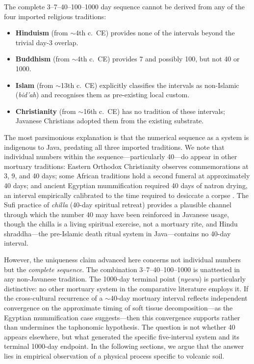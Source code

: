 \documentclass[12pt,a4paper]{article}
\begin{document}
The complete 3--7--40--100--1000 day sequence cannot be derived from any of the four imported religious traditions:

\begin{itemize}[nosep]
\item \textbf{Hinduism} (from $\sim$4th c.\ CE) provides none of the intervals beyond the trivial day-3 overlap.
\item \textbf{Buddhism} (from $\sim$4th c.\ CE) provides 7 and possibly 100, but not 40 or 1000.
\item \textbf{Islam} (from $\sim$13th c.\ CE) explicitly classifies the intervals as non-Islamic (\textit{bid'ah}) and recognises them as pre-existing local custom.
\item \textbf{Christianity} (from $\sim$16th c.\ CE) has no tradition of these intervals; Javanese Christians adopted them from the existing substrate.
\end{itemize}

The most parsimonious explanation is that the numerical sequence as a system is indigenous to Java, predating all three imported traditions. We note that individual numbers within the sequence---particularly 40---do appear in other mortuary traditions: Eastern Orthodox Christianity observes commemorations at 3, 9, and 40 days; some African traditions hold a second funeral at approximately 40 days; and ancient Egyptian mummification required 40 days of natron drying, an interval empirically calibrated to the time required to desiccate a corpse \citep{geertz_1960}. The Sufi practice of \textit{chilla} (40-day spiritual retreat) provides a plausible channel through which the number 40 may have been reinforced in Javanese usage, though the chilla is a living spiritual exercise, not a mortuary rite, and Hindu shraddha---the pre-Islamic death ritual system in Java---contains no 40-day interval.

However, the uniqueness claim advanced here concerns not individual numbers but the \textit{complete sequence}. The combination 3--7--40--100--1000 is unattested in any non-Javanese tradition. The 1000-day terminal point (\textit{nyewu}) is particularly distinctive: no other mortuary system in the comparative literature employs it. If the cross-cultural recurrence of a $\sim$40-day mortuary interval reflects independent convergence on the approximate timing of soft tissue decomposition---as the Egyptian mummification case suggests---then this convergence supports rather than undermines the taphonomic hypothesis. The question is not whether 40 appears elsewhere, but what generated the specific five-interval system and its terminal 1000-day endpoint. In the following sections, we argue that the answer lies in empirical observation of a physical process specific to volcanic soil.
\end{document}
